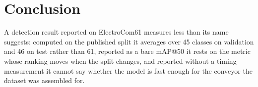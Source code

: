 \section{Conclusion}
\label{sec:conclusion}

%
%
%

A detection result reported on ElectroCom61 measures less than its name suggests:
computed on the published split it averages over 45 classes on validation and 46
on test rather than 61, reported as a bare mAP@50 it rests on the metric whose
ranking moves when the split changes, and reported without a timing measurement
it cannot say whether the model is fast enough for the conveyor the dataset was
assembled for.

